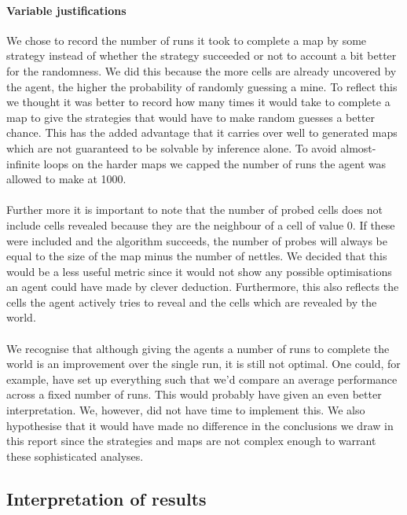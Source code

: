 \documentclass[british]{article}
\begin{document}
\paragraph{Variable justifications}We chose to record the number of runs it took to complete a map by some strategy instead of whether the strategy succeeded or not to account a bit better for the randomness. We did this because the more cells are already uncovered by the agent, the higher the probability of randomly guessing a mine. To reflect this we thought it was better to record how many times it would take to complete a map to give the strategies that would have to make random guesses a better chance. This has the added advantage that it carries over well to generated maps which are not guaranteed to be solvable by inference alone. To avoid almost-infinite loops on the harder maps we capped the number of runs the agent was allowed to make at 1000. 

\paragraph{}Further more it is important to note that the number of probed cells does not include cells revealed because they are the neighbour of a cell of value 0. If these were included and the algorithm succeeds, the number of probes will always be equal to the size of the map minus the number of nettles. We decided that this would be a less useful metric since it would not show any possible optimisations an agent could have made by clever deduction. Furthermore, this also reflects the cells the agent actively tries to reveal and the cells which are revealed by the world. 

\paragraph{} We recognise that although giving the agents a number of runs to complete the world is an improvement over the single run, it is still not optimal. One could, for example, have set up everything such that we'd compare an average performance across a fixed number of runs. This would probably have given an even better interpretation. We, however, did not have time to implement this. We also hypothesise that it would have made no difference in the conclusions we draw in this report since the strategies and maps are not complex enough to warrant these sophisticated analyses. 

\subsection{Interpretation of results}
\label{interpretation}
\end{document}
